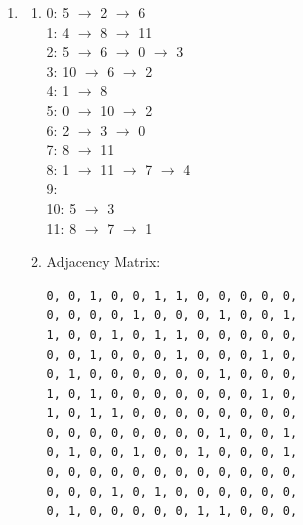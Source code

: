 \documentclass[11pt,fleqn]{article}
\begin{document}
\begin{enumerate}

	\item 	
		\begin{enumerate}
			\item 
0: 5 $\rightarrow$ 2 $\rightarrow$ 6 \\
1: 4 $\rightarrow$ 8 $\rightarrow$ 11 \\
2: 5 $\rightarrow$ 6 $\rightarrow$ 0 $\rightarrow$ 3 \\
3: 10 $\rightarrow$ 6 $\rightarrow$ 2 \\
4: 1 $\rightarrow$ 8 \\
5: 0 $\rightarrow$ 10 $\rightarrow$ 2 \\
6: 2 $\rightarrow$ 3 $\rightarrow$ 0 \\
7: 8 $\rightarrow$ 11 \\
8: 1 $\rightarrow$ 11 $\rightarrow$ 7 $\rightarrow$ 4 \\
9: \\
10: 5 $\rightarrow$ 3 \\
11: 8 $\rightarrow$ 7 $\rightarrow$ 1
			\item Adjacency Matrix:

\begin{verbatim}
0, 0, 1, 0, 0, 1, 1, 0, 0, 0, 0, 0, 
0, 0, 0, 0, 1, 0, 0, 0, 1, 0, 0, 1, 
1, 0, 0, 1, 0, 1, 1, 0, 0, 0, 0, 0, 
0, 0, 1, 0, 0, 0, 1, 0, 0, 0, 1, 0, 
0, 1, 0, 0, 0, 0, 0, 0, 1, 0, 0, 0, 
1, 0, 1, 0, 0, 0, 0, 0, 0, 0, 1, 0, 
1, 0, 1, 1, 0, 0, 0, 0, 0, 0, 0, 0, 
0, 0, 0, 0, 0, 0, 0, 0, 1, 0, 0, 1, 
0, 1, 0, 0, 1, 0, 0, 1, 0, 0, 0, 1, 
0, 0, 0, 0, 0, 0, 0, 0, 0, 0, 0, 0, 
0, 0, 0, 1, 0, 1, 0, 0, 0, 0, 0, 0, 
0, 1, 0, 0, 0, 0, 0, 1, 1, 0, 0, 0, 
\end{verbatim}
		\end{enumerate}

\newpage


\end{enumerate}
\end{document}
